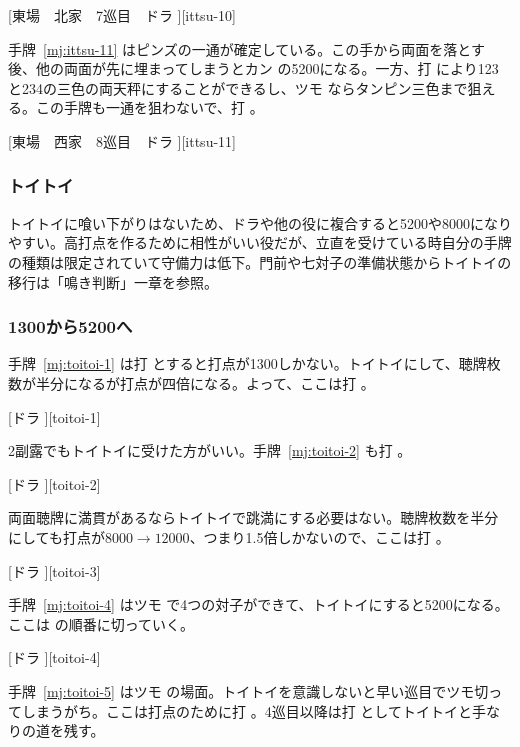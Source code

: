\documentclass[../nankiru_main.tex]{subfiles}
\begin{document}
[東場　北家　7巡目　ドラ ][ittsu-10]

手牌~\ref{mj:ittsu-11} はピンズの一通が確定している。この手から両面を落とす後、他の両面が先に埋まってしまうとカン  の5200になる。一方、打  により123と234の三色の両天秤にすることができるし、ツモ  ならタンピン三色まで狙える。この手牌も一通を狙わないで、打 。

[東場　西家　8巡目　ドラ ][ittsu-11]

\subsubsection{トイトイ}

トイトイに喰い下がりはないため、ドラや他の役に複合すると5200や8000になりやすい。高打点を作るために相性がいい役だが、立直を受けている時自分の手牌の種類は限定されていて守備力は低下\citep{yoteru-toitoi}。門前や七対子の準備状態からトイトイの移行は「鳴き判断」一章を参照。

\subsubsection*{1300から5200へ}

手牌~\ref{mj:toitoi-1} は打  とすると打点が1300しかない。トイトイにして、聴牌枚数が半分になるが打点が四倍になる。よって、ここは打  \citep[][p.~57]{zero-teyaku}。

[ドラ ][toitoi-1]

2副露でもトイトイに受けた方がいい。手牌~\ref{mj:toitoi-2} も打  \citep[][p.~57]{zero-teyaku}。

[ドラ ][toitoi-2]

両面聴牌に満貫があるならトイトイで跳満にする必要はない。聴牌枚数を半分にしても打点が$8000\to12000$、つまり1.5倍しかないので、ここは打  \citep[][p.~57]{zero-teyaku}。

[ドラ ][toitoi-3]

手牌~\ref{mj:toitoi-4} はツモ  で4つの対子ができて、トイトイにすると5200になる。ここは  の順番に切っていく\citep[][p.~57]{zero-teyaku}。

[ドラ ][toitoi-4]

手牌~\ref{mj:toitoi-5} はツモ  の場面。トイトイを意識しないと早い巡目でツモ切ってしまうがち。ここは打点のために打 。4巡目以降は打  としてトイトイと手なりの道を残す\citep[][p.~58]{zero-teyaku}。
\end{document}
